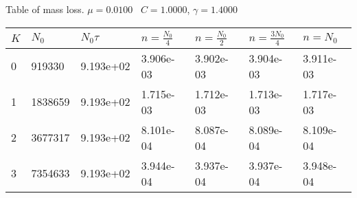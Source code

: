 \begin{center}
Table of mass loss. $\mu = 0.0100$ \, $C = 1.0000$, $\gamma = 1.4000$
  
\begin{tabular}{|p{0.8in}|p{0.8in}|p{0.8in}|p{0.8in}|p{0.8in}|p{0.8in}|p{0.8in}|} \hline
$K$ &$N_0$ &$N_0 \tau$ &$n = \frac{N_0}{4}$ &$n = \frac{N_0}{2}$ &$n = \frac{3N_0}{4}$ &$n = N_0$ \\ \hline 
0 &919330 &9.193e+02 &3.906e-03 &3.902e-03 &3.904e-03 &3.911e-03 \\ \hline 
1 &1838659 &9.193e+02 &1.715e-03 &1.712e-03 &1.713e-03 &1.717e-03 \\ \hline 
2 &3677317 &9.193e+02 &8.101e-04 &8.087e-04 &8.089e-04 &8.109e-04 \\ \hline 
3 &7354633 &9.193e+02 &3.944e-04 &3.937e-04 &3.937e-04 &3.948e-04 \\ \hline 

\end{tabular}\\[20pt]
\end{center}
